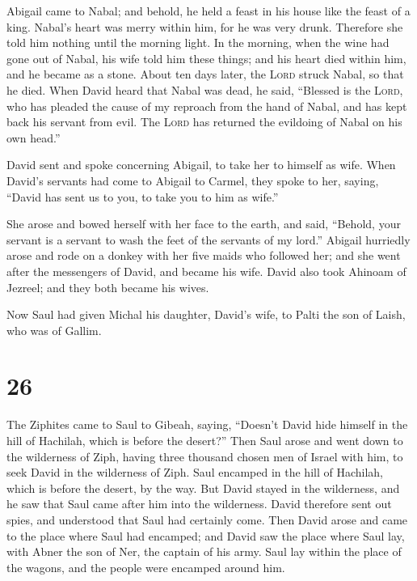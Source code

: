  Abigail came to Nabal; and behold, he held a feast in
his house like the feast of a king. Nabal's heart was merry within him,
for he was very drunk. Therefore she told him nothing until the morning
light.  In the morning, when the wine had gone out of
Nabal, his wife told him these things; and his heart died within him,
and he became as a stone.  About ten days later, the
\textsc{Lord} struck Nabal, so that he died.  When David
heard that Nabal was dead, he said, ``Blessed is the \textsc{Lord}, who
has pleaded the cause of my reproach from the hand of Nabal, and has
kept back his servant from evil. The \textsc{Lord} has returned the
evildoing of Nabal on his own head.''

David sent and spoke concerning Abigail, to take her to himself as wife.
 When David's servants had come to Abigail to Carmel,
they spoke to her, saying, ``David has sent us to you, to take you to
him as wife.''

 She arose and bowed herself with her face to the earth,
and said, ``Behold, your servant is a servant to wash the feet of the
servants of my lord.''  Abigail hurriedly arose and rode
on a donkey with her five maids who followed her; and she went after the
messengers of David, and became his wife.  David also
took Ahinoam of Jezreel; and they both became his wives.

 Now Saul had given Michal his daughter, David's wife, to
Palti the son of Laish, who was of Gallim.

\hypertarget{section-25}{%
\section{26}\label{section-25}}

 The Ziphites came to Saul to Gibeah, saying, ``Doesn't
David hide himself in the hill of Hachilah, which is before the
desert?''  Then Saul arose and went down to the wilderness
of Ziph, having three thousand chosen men of Israel with him, to seek
David in the wilderness of Ziph.  Saul encamped in the
hill of Hachilah, which is before the desert, by the way. But David
stayed in the wilderness, and he saw that Saul came after him into the
wilderness.  David therefore sent out spies, and
understood that Saul had certainly come.  Then David arose
and came to the place where Saul had encamped; and David saw the place
where Saul lay, with Abner the son of Ner, the captain of his army. Saul
lay within the place of the wagons, and the people were encamped around
him.

